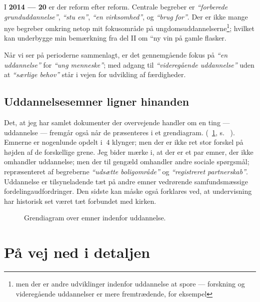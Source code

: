 I \textbf{2014 --- 20} er der reform efter reform.
Centrale begreber er \textit{“forberede grunduddannelse”}, \textit{“stu en”}, \textit{“en virksomhed”}, og \textit{“brug for”}.
Der er ikke mange nye begreber omkring netop mit fokusområde på ungdomsuddannelserne\footnote{men der er andre udviklinger indenfor uddannelse at spore --- forskning og videregående uddannelser er mere fremtrædende, for eksempel}; hvilket kan underbygge min bemærkning fra del II om “ny vin på gamle flasker.

Når vi ser på perioderne sammenlagt, er det gennemgående fokus på \textit{“en uddannelse”} for \textit{“ung menneske”}; med adgang til \textit{“videregående uddannelse”} uden at \textit{“særlige behov”} står i vejen for udvikling af færdigheder.

\section{Uddannelsesemner ligner hinanden}

Det, at jeg har samlet dokumenter der overvejende handler om en ting — uddannelse — 
fremgår også når de præsenteres i et grendiagram. (~\ref{fig:dendro_edu}, s. ~\pageref{fig:dendro_edu}).
Emnerne er nogenlunde opdelt i $~4$ klynger; men der er ikke ret stor forskel på højden af de forskellige grene.
Jeg bider mærke i, at der er et par emner, der ikke omhandler uddannelse; men der til gengæld omhandler andre sociale spørgsmål; repræsenteret af begreberne \textit{“udsætte boligområde”} og \textit{“registreret partnerskab”}.
Uddannelse er tilsyneladende tæt på andre emner vedrørende samfundsmæssige fordelingaudfordringer.
Den sidste kan måske også forklares ved, at undervisning har historisk set været tæt forbundet med kirken.

\begin{figure}
  
\caption{Grendiagram over emner indenfor uddannelse.}
\label{fig:dendro_edu}
\end{figure}

\chapter{På vej ned i detaljen}

